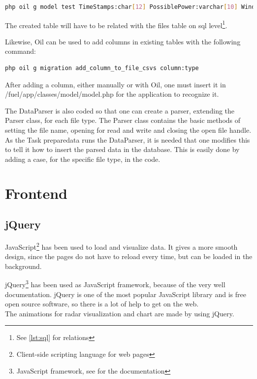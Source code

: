 \begin{lstlisting}[language=sh,caption={Oil command for creating model and migration},label={lst:oil_command}]
php oil g model test TimeStamps:char[12] PossiblePower:varchar[10] WindSpeed:varchar[10] RegimePossible:varchar[10] OutputPower:varchar[10] RegimeOutput:varchar[10] TimeStampsR:char[19] file_id:bigint --no-timestamp
\end{lstlisting}

The created table will have to be related with the \textsf{files} table on sql level\footnote{See \ref{lst:sql} for relations}.

Likewise, \textsf{Oil} can be used to add columns in existing tables with the following command:
\begin{lstlisting}[language=sh]
php oil g migration add_column_to_file_csvs column:type
\end{lstlisting}

After adding a column, either manually or with \textsf{Oil}, one must insert it in \textsf{/fuel/app/classes/model/\<model\>.php} for the application to recognize it.

The \textsf{DataParser} is also coded so that one can create a parser, extending the \textsf{Parser} class, for each file type. The \textsf{Parser} class contains the basic methods of setting the file name, opening for read and write and closing the open file handle. As the \textsf{Task preparedata} runs the \textsf{DataParser}, it is needed that one modifies this to tell it how to insert the parsed data in the database. This is easily done by adding a \textsf{case}, for the specific file type, in the code.

\section{Frontend}
\subsection{jQuery}
JavaScript\footnote{Client-side scripting language for web pages} has been used to load and visualize data. It gives a more smooth design, since the pages do not have to reload every time, but can be loaded in the background.

jQuery\footnote{JavaScript framework, see \cite{jquery} for the documentation} has been used as JavaScript framework, because of the very well documentation. jQuery is one of the most popular JavaScript library and is free open source software, so there is a lot of help to get on the web.\\
The animations for radar visualization and chart are made by using jQuery.
 

